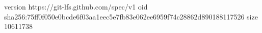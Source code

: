 version https://git-lfs.github.com/spec/v1
oid sha256:75ff0f050e0bcde6f03aa1eec5e7fb83e062ee6959f74c28862d890188117526
size 10611738
